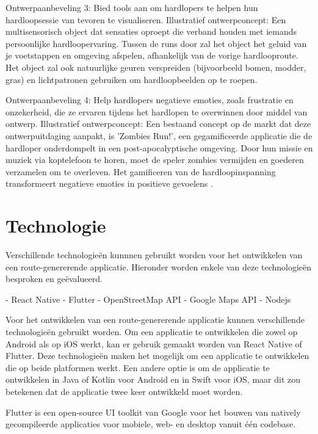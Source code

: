     Ontwerpaanbeveling 3: Bied tools aan om hardlopers te helpen hun hardloopsessie van tevoren te visualiseren. 
    Illustratief ontwerpconcept: Een multisensorisch object dat sensaties oproept die verband houden met iemands persoonlijke hardloopervaring. 
    Tussen de runs door zal het object het geluid van je voetstappen en omgeving afspelen, afhankelijk van de vorige hardlooproute. 
    Het object zal ook natuurlijke geuren verspreiden (bijvoorbeeld bomen, modder, gras) en lichtpatronen gebruiken om hardloopbeelden op te roepen.

    Ontwerpaanbeveling 4: Help hardlopers negatieve emoties, zoals frustratie en onzekerheid, die ze ervaren tijdens het hardlopen te overwinnen 
    door middel van ontwerp. 
    Illustratief ontwerpconcept: Een bestaand concept op de markt dat deze ontwerpuitdaging aanpakt, is 'Zombies Run!', 
    een gegamificeerde applicatie die de hardloper onderdompelt in een post-apocalyptische omgeving. 
    Door hun missie en muziek via koptelefoon te horen, moet de speler zombies vermijden en goederen verzamelen om te overleven. 
    Het gamificeren van de hardloopinspanning transformeert negatieve emoties in positieve gevoelens \autocite{Menheere2020}.

    \section{Technologie}

    Verschillende technologieën kunnnen gebruikt worden voor het ontwikkelen van een route-genererende applicatie. 
    Hieronder worden enkele van deze technologieën besproken en geëvalueerd.

    - React Native
    - Flutter
    - OpenStreetMap API
    - Google Maps API
    - Nodejs

    Voor het ontwikkelen van een route-genererende applicatie kunnen verschillende technologieën gebruikt worden. 
    Om een applicatie te ontwikkelen die zowel op Android als op iOS werkt, kan er gebruik gemaakt worden van React Native of Flutter.
    Deze technologieën maken het mogelijk om een applicatie te ontwikkelen die op beide platformen werkt.
    Een andere optie is om de applicatie te ontwikkelen in Java of Kotlin voor Android en in Swift voor iOS,
    maar dit zou betekenen dat de applicatie twee keer ontwikkeld moet worden.

    Flutter is een open-source UI toolkit van Google voor het bouwen van natively gecompileerde applicaties voor mobiele, web- en desktop vanuit één codebase.

